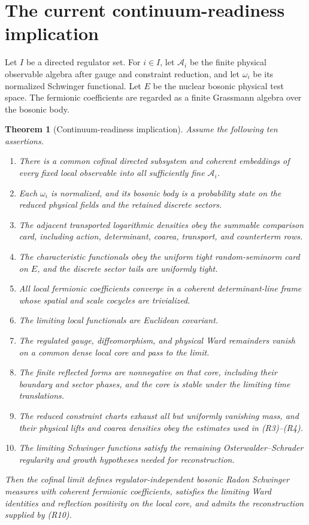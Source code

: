 \documentclass[11pt]{article}
\newtheorem{theorem}{Theorem}[section]
\begin{document}
\section{The current continuum-readiness implication}
\label{sec:v11v1-readiness}

Let \(I\) be a directed regulator set.  For \(i\in I\), let
\(\mathcal A_i\) be the finite physical observable algebra after gauge and
constraint reduction, and let \(\omega_i\) be its normalized Schwinger
functional.  Let \(E\) be the nuclear bosonic physical test space.  The
fermionic coefficients are regarded as a finite Grassmann algebra over the
bosonic body.

\begin{theorem}[Continuum-readiness implication]
\label{thm:v11v1-readiness}
Assume the following ten assertions.
\begin{enumerate}[label=\textnormal{(R\arabic*)}]
\item There is a common cofinal directed subsystem and coherent embeddings
of every fixed local observable into all sufficiently fine
\(\mathcal A_i\).
\item Each \(\omega_i\) is normalized, and its bosonic body is a probability
state on the reduced physical fields and the retained discrete sectors.
\item The adjacent transported logarithmic densities obey the summable
comparison card, including action, determinant, coarea, transport, and
counterterm rows.
\item The characteristic functionals obey the uniform tight random-seminorm
card on \(E\), and the discrete sector tails are uniformly tight.
\item All local fermionic coefficients converge in a coherent
determinant-line frame whose spatial and scale cocycles are trivialized.
\item The limiting local functionals are Euclidean covariant.
\item The regulated gauge, diffeomorphism, and physical Ward remainders
vanish on a common dense local core and pass to the limit.
\item The finite reflected forms are nonnegative on that core, including
their boundary and sector phases, and the core is stable under the limiting
time translations.
\item The reduced constraint charts exhaust all but uniformly vanishing
mass, and their physical lifts and coarea densities obey the estimates used
in (R3)--(R4).
\item The limiting Schwinger functions satisfy the remaining
Osterwalder--Schrader regularity and growth hypotheses needed for
reconstruction.
\end{enumerate}
Then the cofinal limit defines regulator-independent bosonic Radon
Schwinger measures with coherent fermionic coefficients, satisfies the
limiting Ward identities and reflection positivity on the local core, and
admits the reconstruction supplied by (R10).
\end{theorem}
\end{document}
